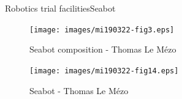 \documentclass[9pt, xcolor={usenames, dvipsnames}]{beamer}
\begin{document}
			\begin{frame}{Robotics trial facilities}{Seabot~}
				\centering
				\begin{minipage}{0.45\textwidth}
					\begin{figure}
						\texttt{[image: images/mi190322-fig3.eps]}
						\caption{Seabot composition - Thomas Le Mézo}
					\end{figure}
				\end{minipage}
				\hspace{1cm}
				\begin{minipage}{0.3\textwidth}
					\begin{figure}
						\texttt{[image: images/mi190322-fig14.eps]}
						\caption{Seabot - Thomas Le Mézo}
					\end{figure}
				\end{minipage}
			\end{frame}
\end{document}
